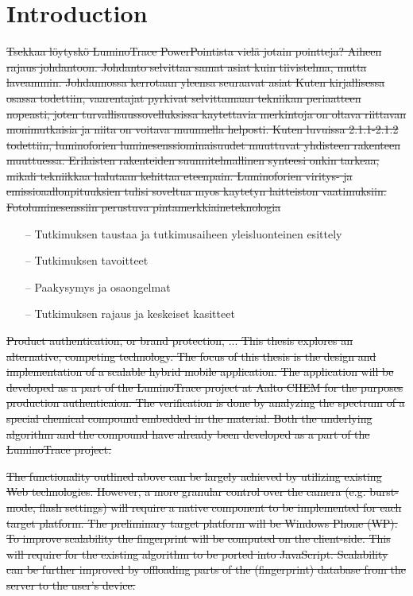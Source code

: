 \documentclass[thesis.tex]{subfiles}
\begin{document}
\chapter{Introduction}
\label{chapter:intro}



\sout{Tsekkaa löytyskö LuminoTrace PowerPointista vielä jotain pointteja?
Aiheen rajaus johdantoon.
Johdanto selvittaa samat asiat kuin tiivistelma, mutta laveammin. Johdannossa kerrotaan yleensa seuraavat asiat
Kuten kirjallisessa osassa todettiin, vaarentajat pyrkivat selvittamaan tekniikan periaatteen nopeasti, joten turvallisuussovelluksissa kaytettavia merkintoja on oltava riittavan monimutkaisia ja niita on voitava muunnella helposti. Kuten luvuissa 2.1.1-2.1.2 todettiin, luminoforien luminesenssiominaisuudet muuttuvat yhdisteen rakenteen muuttuessa. Erilaisten rakenteiden suunnitelmallinen synteesi onkin tarkeaa, mikali tekniikkaa halutaan kehittaa eteenpain. Luminoforien viritys- ja emissioaallonpituuksien tulisi soveltua myos kaytetyn laitteiston vaatimuksiin.
Fotoluminesenssiin perustuva pintamerkkiaineteknologia}

\begin{itemize}
\item[--]Tutkimuksen taustaa ja tutkimusaiheen yleisluonteinen esittely
\item[--]Tutkimuksen tavoitteet
\item[--]Paakysymys ja osaongelmat
\item[--]Tutkimuksen rajaus ja keskeiset kasitteet
\end{itemize}

\sout{Product authentication, or brand protection, ...
This thesis explores an alternative, competing technology.
The focus of this thesis is the design and implementation of a scalable hybrid mobile application. The application will be developed as a part of the LuminoTrace project at Aalto CHEM for the purposes production authenticaion.
The verification is done by analyzing the spectrum of a special chemical compound embedded in the material. Both the underlying algorithm and the compound have already been developed as a part of the LuminoTrace project.}

\sout{The functionality outlined above can be largely achieved by utilizing existing Web technologies. However, a more granular control over the camera (e.g. burst-mode, flash settings) will require a native component to be implemented for each target platform. The preliminary target platform will be Windows Phone (WP). To improve scalability the fingerprint will be computed on the client-side. This will require for the existing algorithm to be ported into JavaScript. Scalability can be further improved by offloading parts of the (fingerprint) database from the server to the user's device.}
\end{document}
